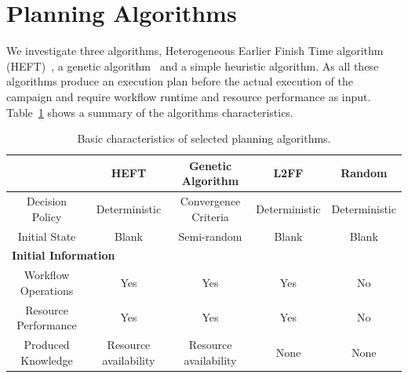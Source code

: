 
\section{Planning Algorithms}
\label{sec:algo}

We investigate three algorithms, Heterogeneous Earlier Finish Time algorithm (HEFT)~\cite{topcuoglu2002performance}, a genetic algorithm~\cite{page2005algorithm} and a simple heuristic algorithm.
As all these algorithms produce an execution plan before the actual execution of the campaign and require workflow runtime and resource performance as input.
Table~\ref{tab:sched_algo} shows a summary of the algorithms characteristics.

\begin{table}[t]
    \centering
    \scriptsize
    \begin{tabular}{@{}ccccc@{}}
        \toprule
        &\textbf{HEFT}     &\textbf{Genetic Algorithm} &\textbf{L2FF} & \textbf{Random} \\
        \midrule
        Decision Policy   &Deterministic &Convergence Criteria &Deterministic& Deterministic\\
        Initial State    &Blank &Semi-random &Blank & Blank\\
        \midrule
        \multicolumn{5}{l}{\textbf{Initial Information}}\\\midrule
        Workflow Operations &Yes & Yes & Yes & No\\
        Resource Performance &Yes &Yes &Yes & No\\
        \midrule
        Produced Knowledge& Resource availability& Resource availability&None&None\\
        \bottomrule
    \end{tabular}
    \caption{Basic characteristics of selected planning algorithms.\label{tab:sched_algo}}
\end{table}

